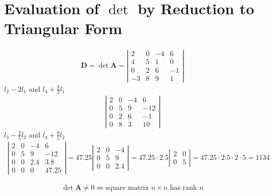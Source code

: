 \section{Evaluation of $\det$ by Reduction to Triangular Form}
\begin{myExample}
	\begin{eqnarray*}
		\mathbf{D}=\det \mathbf{A}=
		\left|
		\begin{matrix}
			2&0&-4&6\\
			4&5&1&0\\
			0&2&6&-1\\
			-3&8&9&1
		\end{matrix}
		\right|
	\end{eqnarray*}
	$l_2-2l_1$ and $l_4+\frac{3}{2}l_1$
	\begin{eqnarray*}
		\left|
		\begin{matrix}
			2&0&-4&6\\
			0&5&9&-12\\
			0&2&6&-1\\
			0&8&3&10
		\end{matrix}
		\right|
	\end{eqnarray*}
	$l_3-\frac{2}{5}l_2$ and $l_4+\frac{8}{5}l_2$
	\begin{eqnarray*}
		\left|
		\begin{matrix}
			2&0&-4&6\\
			0&5&9&-12\\
			0&0&2.4&3.8\\
			0&0&0&47.25
		\end{matrix}
		\right|=
		47.25
			\left|
			\begin{matrix}
				2&0&-4\\
				0&5&9\\
				0&0&2.4
			\end{matrix}
			\right|
			=
			47.25\cdot2.5
				\left|
				\begin{matrix}
					2&0\\
					0&5	
				\end{matrix}
				\right|
				=47.25\cdot2.5\cdot2\cdot5=1134
	\end{eqnarray*}
\end{myExample}

\begin{myDefinition}
	\begin{eqnarray}
		\det \mathbf{A}\neq0\Leftrightarrow \text{square matrix $n\times n$ has rank }n
	\end{eqnarray}
\end{myDefinition}
